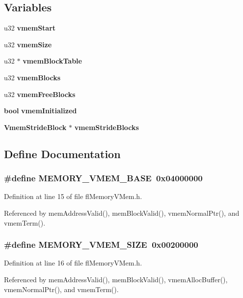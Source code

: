 \subsection*{Variables}
\begin{CompactItemize}
\item 
u32 {\bf vmem\-Start}
\item 
u32 {\bf vmem\-Size}
\item 
u32 $\ast$ {\bf vmem\-Block\-Table}
\item 
u32 {\bf vmem\-Blocks}
\item 
u32 {\bf vmem\-Free\-Blocks}
\item 
{\bf bool} {\bf vmem\-Initialized}
\item 
{\bf Vmem\-Stride\-Block} $\ast$ {\bf vmem\-Stride\-Blocks}
\end{CompactItemize}


\subsection{Define Documentation}
\subsubsection{\setlength{\rightskip}{0pt plus 5cm}\#define MEMORY\_\-VMEM\_\-BASE~0x04000000}\label{flMemoryVMem_8h_39f2bc0f404515fec846a50b92c8c327}




Definition at line 15 of file fl\-Memory\-VMem.h.

Referenced by mem\-Address\-Valid(), mem\-Block\-Valid(), vmem\-Normal\-Ptr(), and vmem\-Term().
\subsubsection{\setlength{\rightskip}{0pt plus 5cm}\#define MEMORY\_\-VMEM\_\-SIZE~0x00200000}\label{flMemoryVMem_8h_4832da4fc8e46c26f98eb7d9c45faed6}




Definition at line 16 of file fl\-Memory\-VMem.h.

Referenced by mem\-Address\-Valid(), mem\-Block\-Valid(), vmem\-Alloc\-Buffer(), vmem\-Normal\-Ptr(), and vmem\-Term().
